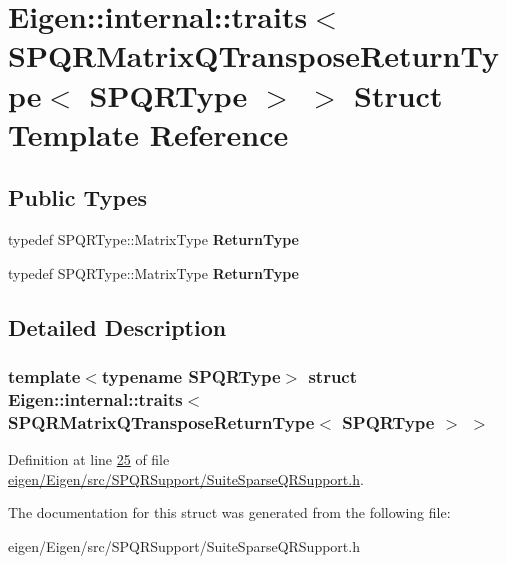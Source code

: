 \hypertarget{struct_eigen_1_1internal_1_1traits_3_01_s_p_q_r_matrix_q_transpose_return_type_3_01_s_p_q_r_type_01_4_01_4}{}\section{Eigen\+:\+:internal\+:\+:traits$<$ S\+P\+Q\+R\+Matrix\+Q\+Transpose\+Return\+Type$<$ S\+P\+Q\+R\+Type $>$ $>$ Struct Template Reference}
\label{struct_eigen_1_1internal_1_1traits_3_01_s_p_q_r_matrix_q_transpose_return_type_3_01_s_p_q_r_type_01_4_01_4}
\subsection*{Public Types}
\begin{DoxyCompactItemize}
\item 
\mbox{\label{struct_eigen_1_1internal_1_1traits_3_01_s_p_q_r_matrix_q_transpose_return_type_3_01_s_p_q_r_type_01_4_01_4_a0bcc1fcd4467fd942ce61a11c5167ea2}} 
typedef S\+P\+Q\+R\+Type\+::\+Matrix\+Type {\bfseries Return\+Type}
\item 
\mbox{\label{struct_eigen_1_1internal_1_1traits_3_01_s_p_q_r_matrix_q_transpose_return_type_3_01_s_p_q_r_type_01_4_01_4_a0bcc1fcd4467fd942ce61a11c5167ea2}} 
typedef S\+P\+Q\+R\+Type\+::\+Matrix\+Type {\bfseries Return\+Type}
\end{DoxyCompactItemize}


\subsection{Detailed Description}
\subsubsection*{template$<$typename S\+P\+Q\+R\+Type$>$\newline
struct Eigen\+::internal\+::traits$<$ S\+P\+Q\+R\+Matrix\+Q\+Transpose\+Return\+Type$<$ S\+P\+Q\+R\+Type $>$ $>$}



Definition at line \hyperlink{eigen_2_eigen_2src_2_s_p_q_r_support_2_suite_sparse_q_r_support_8h_source_l00025}{25} of file \hyperlink{eigen_2_eigen_2src_2_s_p_q_r_support_2_suite_sparse_q_r_support_8h_source}{eigen/\+Eigen/src/\+S\+P\+Q\+R\+Support/\+Suite\+Sparse\+Q\+R\+Support.\+h}.



The documentation for this struct was generated from the following file\+:\begin{DoxyCompactItemize}
\item 
eigen/\+Eigen/src/\+S\+P\+Q\+R\+Support/\+Suite\+Sparse\+Q\+R\+Support.\+h\end{DoxyCompactItemize}
